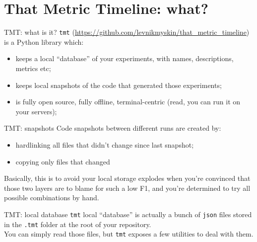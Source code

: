 \documentclass[aspectratio=169,xcolor={dvipsnames}]{beamer}
\begin{document}
  \section{That Metric Timeline: what?}
  \begin{frame}{TMT: what is it?}
    \texttt{tmt} (\url{https://github.com/levnikmyskin/that_metric_timeline}) is a Python library which:
    \begin{itemize}
      \item keeps a local ``database'' of your experiments, with names, descriptions, metrics etc;
      \item keeps local snapshots of the code that generated those experiments;
      \item is fully open source, fully offline, terminal-centric (read, you can run it on your servers);
    \end{itemize}
  \end{frame}
  \begin{frame}{TMT: snapshots}
    Code snapshots between different runs are created by:
    \begin{itemize}
      \item hardlinking all files that didn't change since last snapshot;
      \item copying only files that changed
    \end{itemize}
    Basically, this is to avoid your local storage explodes when you're convinced that 
    those two layers are to blame for such a low F1, and you're determined to try all possible 
    combinations by hand.
  \end{frame}
  \begin{frame}{TMT: local database}
    \texttt{tmt} local ``database'' is actually a bunch of \texttt{json} files stored
    in the \texttt{.tmt} folder at the root of your repository.\\
    You can simply read those files, but \texttt{tmt} exposes a few utilities to deal with them.
  \end{frame}
\end{document}
